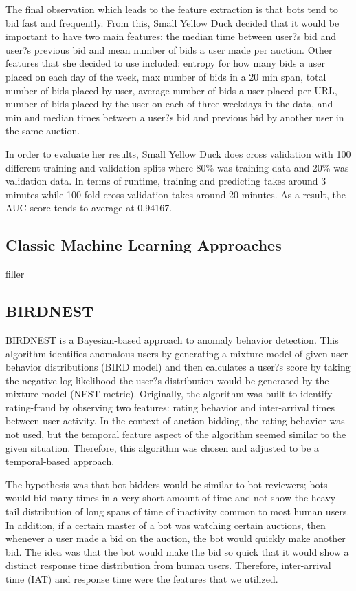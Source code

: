 \documentclass{article} %
\begin{document}
The final observation which leads to the feature extraction is that bots tend to bid fast and frequently.
From this, Small Yellow Duck decided that it would be important to have two main features: the median time between user?s bid and user?s previous bid and mean number of bids a user made per auction.
Other features that she decided to use included: entropy for how many bids a user placed on each day of the week, max number of bids in a 20 min span, total number of bids placed by user, average number of bids a user placed per URL, number of bids placed by the user on each of three weekdays in the data, and min and median times between a user?s bid and previous bid by another user in the same auction.

In order to evaluate her results, Small Yellow Duck does cross validation with 100 different training and validation splits where 80\% was training data and 20\% was validation data.
In terms of runtime, training and predicting takes around 3 minutes while 100-fold cross validation takes around 20 minutes.
As a result, the AUC score tends to average at 0.94167.

\subsection{Classic Machine Learning Approaches}

filler

\subsection{BIRDNEST}

BIRDNEST is a Bayesian-based approach to anomaly behavior detection.
This algorithm identifies anomalous users by generating a mixture model of given user behavior distributions (BIRD model) and then calculates a user?s score by taking the negative log likelihood the user?s distribution would be generated by the mixture model (NEST metric).
Originally, the algorithm was built to identify rating-fraud by observing two features: rating behavior and inter-arrival times between user activity.
In the context of auction bidding, the rating behavior was not used, but the temporal feature aspect of the algorithm seemed similar to the given situation.
Therefore, this algorithm was chosen and adjusted to be a temporal-based approach.

The hypothesis was that bot bidders would be similar to bot reviewers; bots would bid many times in a very short amount of time and not show the heavy-tail distribution of long spans of time of inactivity common to most human users.
In addition, if a certain master of a bot was watching certain auctions, then whenever a user made a bid on the auction, the bot would quickly make another bid.
The idea was that the bot would make the bid so quick that it would show a distinct response time distribution from human users.
Therefore, inter-arrival time (IAT) and response time were the features that we utilized.
\end{document}
